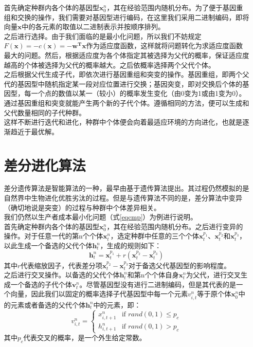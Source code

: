 \documentclass[11pt,a4paper]{article}
\begin{document}
首先确定种群内各个体的基因型$\mathbf{x}^n_0$，其在经验范围内随机分布。为了便于基因重组和交换的操作，我们需要对基因型进行编码，在这里我们采用二进制编码，即将向量$\mathbf{x}$中的各元素的取值以二进制表示并按顺序排列。\\

之后进行选择。由于我们面临的是最小化问题，所以我们不妨规定$F(\mathbf{x})=-c(\mathbf{x})=-\mathbf{w^T x}$作为适应度函数，这样就将问题转化为求适应度函数最大的问题。然后，根据适应度为各个体指定其被选择为父代的概率，保证适应度越高的个体被选择为父代的概率越大。之后依概率选择两个父代个体。\\

之后根据父代生成子代，即依次进行基因重组和突变的操作。基因重组，即两个父代的基因型中随机指定某一段对应位置进行交换；基因突变，即对交换后个体的基因型，每一个点的数值以某一（较小）的概率发生变化（由0变为1或由1变为0）。通过基因重组和突变就能产生两个新的子代个体。遵循相同的方法，便可以生成和父代数量相同的子代种群。\\

这样不断进行迭代和进化，种群中个体便会向着最适应环境的方向进化，也就是逐渐趋近于最优解。

\section{差分进化算法}
差分遗传算法是智能算法的一种，最早由\textcite{RN5878}基于遗传算法提出。其过程仍然模拟的是自然界中生物进化优胜劣汰的过程。但是与遗传算法不同的是，差分算法中变异（确切地说是突变）的过程与种群中个体差异相关。\\

我们仍然以生产者成本最小化问题（式\ref{eqcmp}）为例进行说明。\\

首先确定种群内各个体的基因型$\mathbf{x}^n_0$，其在经验范围内随机分布。之后进行变异的操作。对于任意一代的第n个个体$\mathbf{x}^n_{t}$，选定种群中任意的三个个体$\mathbf{x}^{p_{1}}_{t}$、$\mathbf{x}^{p_{2}}_{t}$和$\mathbf{x}^{p_{3}}_{t}$，以此生成一个备选的父代个体$\mathbf{h}^n_{t}$，生成的规则如下：
\begin{equation}
    \mathbf{h}^n_{t}=\mathbf{x}^{p_{1}}_{t}+r(\mathbf{x}^{p_{2}}_{t}-\mathbf{x}^{p_{3}}_{t})
\end{equation}
其中$r$代表缩放因子，代表差分项$\mathbf{x}^{p_{2}}_{t}-\mathbf{x}^{p_{3}}_{t}$对于备选父代基因型的影响程度。\\

之后进行交叉操作。以备选的父代个体$\mathbf{h}^n_{t}$和第n个个体自身$\mathbf{x}^n_{t}$为父代，进行交叉生成一个备选的子代个体$\mathbf{v}^n_{t}$。尽管基因型没有进行二进制编码，但是其代表的是一个向量，因此我们以固定的概率选择子代基因型中每一个元素$v^n_{i,t}
$等于原个体$\mathbf{x}^n_0$中的元素或者备选的父代个体$\mathbf{h}^n_{t}$中的元素，即：
\begin{equation}
    v^n_{i,t}=
    \begin{cases}
      x^n_{i,t+1} & \text{if } rand(0,1) \leq p_c \\
      h^n_{i,t+1} & \text{if } rand(0,1) > p_c
    \end{cases}
\end{equation}
其中$p_c$代表交叉的概率，是一个外生给定常数。\\
\end{document}
